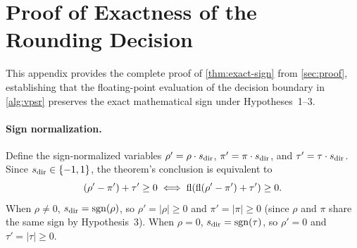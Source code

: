 \section{Proof of Exactness of the Rounding Decision}
\label{app:proof-exact-sign}

This appendix provides the complete proof of \cref{thm:exact-sign} from
\cref{sec:proof}, establishing that the floating-point evaluation of the
decision boundary in \cref{alg:vpsr} preserves the exact mathematical sign under
Hypotheses~1--3.

\paragraph{Sign normalization.}
Define the sign-normalized variables $\rho' = \rho \cdot s_{\rm dir}$, $\pi' = \pi \cdot s_{\rm dir}$, and $\tau' = \tau \cdot s_{\rm dir}$. Since $s_{\rm dir} \in \{-1, 1\}$, the theorem's conclusion is equivalent to
\[
(\rho' - \pi') + \tau' \ge 0 \iff \mathrm{fl}(\mathrm{fl}(\rho' - \pi') + \tau') \ge 0 .
\]
When $\rho \ne 0$, $s_{\rm dir} = \mathrm{sgn}(\rho)$, so $\rho' = |\rho| \ge 0$ and $\pi' = |\pi| \ge 0$ (since $\rho$ and $\pi$ share the same sign by Hypothesis~3). When $\rho = 0$, $s_{\rm dir} = \mathrm{sgn}(\tau)$, so $\rho' = 0$ and $\tau' = |\tau| \ge 0$.


